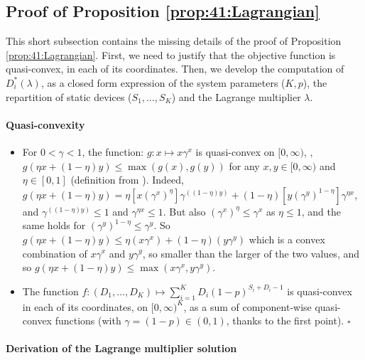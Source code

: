 \subsection{Proof of Proposition \ref{prop:41:Lagrangian}}
\label{sec:5:proofLagrangian}

This short subsection contains the missing details of the proof of Proposition \ref{prop:41:Lagrangian}.
%
First, we need to justify that the objective function is quasi-convex, in each of its coordinates.
%
Then, we develop the computation of $D_i^*(\lambda)$, as a closed form expression of the system parameters ($K, p$), the repartition of static devices ($S_1,\dots,S_{K}$) and the Lagrange multiplier $\lambda$.

\paragraph{Quasi-convexity}

\begin{itemize}
	\item
	For $0 < \gamma < 1$, the function: $g: x \mapsto x \gamma^x$ is quasi-convex on $[0,\infty)$, \ie, $g(\eta x + (1-\eta)y) \leq \max(g(x), g(y))$ for any $x,y \in [0,\infty)$ and $\eta \in [0,1]$ (definition from \cite{Luenberger68}).
    Indeed, $g(\eta x + (1-\eta)y) = \eta \left[ x (\gamma^x)^{\eta} \right] \gamma^{((1-\eta)y)} + (1-\eta)\left[ y (\gamma^y)^{1-\eta}\right] \gamma^{\eta x}$, and $\gamma^{((1-\eta)y)} \leq 1$ and $\gamma^{\eta x} \leq 1$. But also $(\gamma^x)^{\eta} \leq \gamma^x$ as $\eta \leq 1$, and the same holds for $(\gamma^y)^{1-\eta} \leq \gamma^y$. So $g(\eta x + (1-\eta)y) \leq \eta (x \gamma^x) + (1 - \eta) (y \gamma^y)$ which is a convex combination of $x \gamma^x$ and $y \gamma^y$, so smaller than the larger of the two values, and so $g(\eta x + (1-\eta)y) \leq \max(x \gamma^x, y \gamma^y)$.

    \item
    The function $f: (D_1, \dots, D_{K}) \mapsto \sum_{i=1}^{K} D_i (1 - p)^{S_i + D_i -1}$ is quasi-convex in each of its coordinates, on $[0,\infty)^{K}$, as a sum of component-wise quasi-convex functions (with $\gamma = (1 - p) \in (0, 1)$, thanks to the first point).
    \hfill{}$\square$
\end{itemize}


\paragraph{Derivation of the Lagrange multiplier solution}

